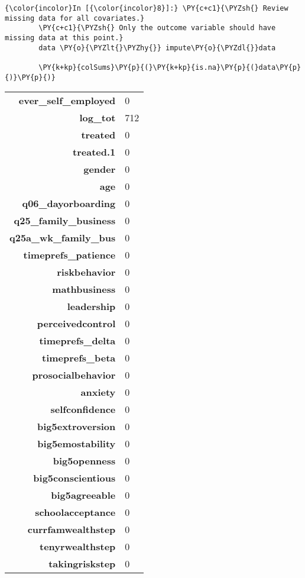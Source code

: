   \begin{Verbatim}[commandchars=\\\{\}]
{\color{incolor}In [{\color{incolor}8}]:} \PY{c+c1}{\PYZsh{} Review missing data for all covariates.}
        \PY{c+c1}{\PYZsh{} Only the outcome variable should have missing data at this point.}
        data \PY{o}{\PYZlt{}\PYZhy{}} impute\PY{o}{\PYZdl{}}data
        
        \PY{k+kp}{colSums}\PY{p}{(}\PY{k+kp}{is.na}\PY{p}{(}data\PY{p}{)}\PY{p}{)}
\end{Verbatim}


    \begin{longtable}{rl}
\textbf{ever\_self\_employed} & 0\\
\textbf{log\_tot} & 712\\
\textbf{treated} & 0\\
\textbf{treated.1} & 0\\
\textbf{gender} & 0\\
\textbf{age} & 0\\
\textbf{q06\_dayorboarding} & 0\\
\textbf{q25\_family\_business} & 0\\
\textbf{q25a\_wk\_family\_bus} & 0 \\
\textbf{timeprefs\_patience} & 0\\
\textbf{riskbehavior} & 0 \\
\textbf{mathbusiness} & 0 \\
\textbf{leadership} & 0 \\
\textbf{perceivedcontrol} & 0 \\
\textbf{timeprefs\_delta} & 0 \\
\textbf{timeprefs\_beta} & 0 \\
\textbf{prosocialbehavior} & 0 \\
\textbf{anxiety} & 0 \\
\textbf{selfconfidence} & 0 \\
\textbf{big5extroversion} & 0 \\
\textbf{big5emostability} & 0 \\
\textbf{big5openness} & 0 \\
\textbf{big5conscientious} & 0 \\
\textbf{big5agreeable} & 0 \\
\textbf{schoolacceptance} & 0 \\
\textbf{currfamwealthstep} & 0 \\
\textbf{tenyrwealthstep} & 0 \\
\textbf{takingriskstep} & 0 \\

\end{longtable}
